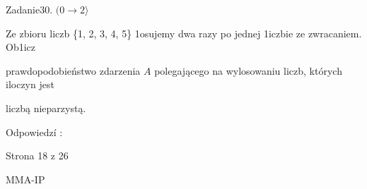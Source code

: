 \documentclass[a4paper,12pt]{article}
\begin{document}
Zadanie30. $(0\rightarrow 2\rangle$

Ze zbioru liczb \{1, 2, 3, 4, 5\} 1osujemy dwa razy po jednej 1iczbie ze zwracaniem. Ob1icz

prawdopodobieństwo zdarzenia $A$ polegającego na wylosowaniu liczb, których iloczyn jest

liczbą nieparzystą.

Odpowiedzí :

Strona 18 z 26

MMA-IP
\end{document}
